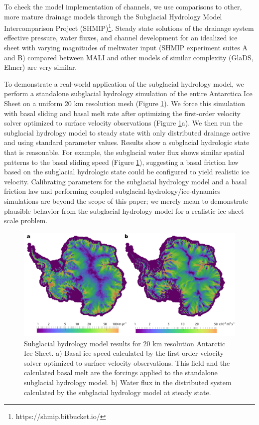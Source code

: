 To check the model implementation of channels, we use comparisons to other, more mature drainage models
through the Subglacial Hydrology Model Intercomparison Project (SHMIP)\footnote{https://shmip.bitbucket.io/}.
Steady state solutions of the drainage system effective pressure, water fluxes, and channel development
for an idealized ice sheet with varying magnitudes of meltwater input (SHMIP experiment suites A and B)
compared between MALI and other models of similar complexity (GlaDS, Elmer) are very similar.

To demonstrate a real-world application of the subglacial hydrology model,
we perform a standalone subglacial hydrology simulation of the entire Antarctica Ice Sheet on a uniform 20 km resolution mesh (Figure \ref{fig:sgh:aisflux}).
We force this simulation with basal sliding and basal melt rate after optimizing the first-order velocity solver optimized to surface velocity observations (Figure \ref{fig:sgh:aisflux}a).
We then run the subglacial hydrology model to steady state with only distributed drainage active and using standard parameter values.
Results show a subglacial hydrologic state that is reasonable.
For example, the subglacial water flux shows similar spatial patterns to the basal sliding speed (Figure \ref{fig:sgh:aisflux}),
suggesting a basal friction law based on the subglacial hydrologic state could be configured to 
yield realistic ice velocity.
Calibrating parameters for the subglacial hydrology model and a basal friction law
and performing coupled subglacial-hydrology/ice-dynamics simulations are beyond the scope of this paper;
we merely mean to demonstrate plausible behavior from the subglacial hydrology model for a realistic ice-sheet-scale problem.

\begin{figure}[t]
\includegraphics[width=15.3cm]{landice/figures/speed_vs_hydroflux_clean.png}
\caption{Subglacial hydrology model results for 20 km resolution Antarctic Ice Sheet. 
a) Basal ice speed calculated by the first-order velocity solver optimized to surface velocity observations.  This field and the calculated basal melt are the forcings applied to the standalone subglacial hydrology model.
b) Water flux  in the distributed system calculated by the subglacial hydrology model at steady state.
}
\label{fig:sgh:aisflux}
\end{figure}


